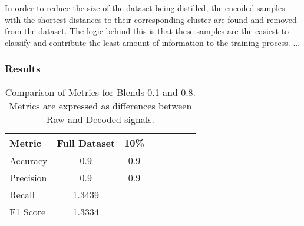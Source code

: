 In order to reduce the size of the dataset being distilled, the encoded samples with the shortest distances to their corresponding cluster are found and removed from the dataset. The logic behind this is that these samples are the easiest to classify and contribute the least amount of information to the training process. ...

\subsubsection{Results}


%
\begin{table}[ht]
    \centering
    \begin{tabular}{l|c|c|c|c|c|c|c}
        \hline
        \textbf{Metric} & \textbf{Full Dataset} & \textbf{10\%} & & & & & \\ 
        \hline
        
        Accuracy & 
 0.9
        & 
        0.9  & & & & & \\
        
        Precision & 
        0.9
        & 
        0.9  & & & & & \\

        Recall & 1.3439 & \color{blue}{1.2631}  & & & & & \\ 
 
        F1 Score & 1.3334 & \color{blue}{1.0186}  & & & & &\\ 
 
    \end{tabular}
    \caption{Comparison of Metrics for Blends 0.1 and 0.8. Metrics are expressed as differences between Raw and Decoded signals.}
    \label{tab:dataset_distillation_results}
\end{table}
%

